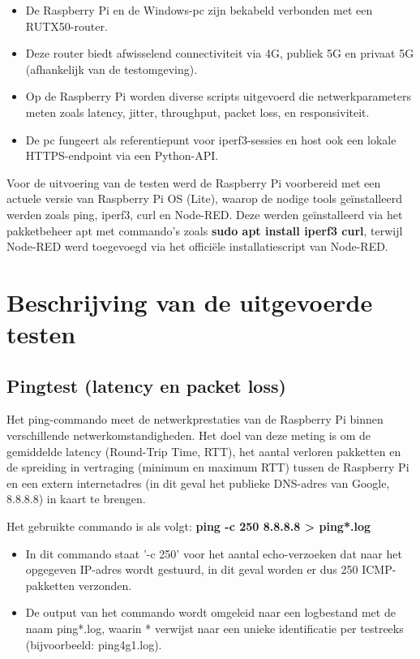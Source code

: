 \begin{itemize}
    \item De Raspberry Pi en de Windows-pc zijn bekabeld verbonden met een RUTX50-router.
    \item Deze router biedt afwisselend connectiviteit via 4G, publiek 5G en privaat 5G (afhankelijk van de testomgeving).
    \item Op de Raspberry Pi worden diverse scripts uitgevoerd die netwerkparameters meten zoals latency, jitter, throughput, packet loss, en responsiviteit.
    \item De pc fungeert als referentiepunt voor iperf3-sessies en host ook een lokale HTTPS-endpoint via een Python-API.
\end{itemize}

Voor de uitvoering van de testen werd de Raspberry Pi voorbereid met een actuele versie van Raspberry Pi OS (Lite), waarop de nodige tools geïnstalleerd werden zoals ping, iperf3, curl en Node-RED. Deze werden geïnstalleerd via het pakketbeheer apt met commando’s zoals \textbf{sudo apt install iperf3 curl}, terwijl Node-RED werd toegevoegd via het officiële installatie­script van Node-RED.

\section{Beschrijving van de uitgevoerde testen}

\subsection{Pingtest (latency en packet loss)}
Het ping-commando meet de netwerkprestaties van de Raspberry Pi binnen verschillende netwerkomstandigheden. Het doel van deze meting is om de gemiddelde latency (Round-Trip Time, RTT), het aantal verloren pakketten en de spreiding in vertraging (minimum en maximum RTT) tussen de Raspberry Pi en een extern internetadres (in dit geval het publieke DNS-adres van Google, 8.8.8.8) in kaart te brengen.

Het gebruikte commando is als volgt: \textbf{ping -c 250 8.8.8.8 > ping*.log}

\begin{itemize}
    \item In dit commando staat ’-c 250’ voor het aantal echo-verzoeken dat naar het opgegeven IP-adres wordt gestuurd, in dit geval worden er dus 250 ICMP-pakketten verzonden. 
    \item De output van het commando wordt omgeleid naar een logbestand met de naam ping*.log, waarin * verwijst naar een unieke identificatie per testreeks (bijvoorbeeld: ping4g1.log).
\end{itemize}



